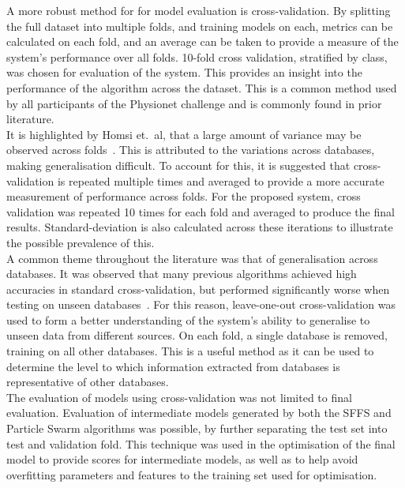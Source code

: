 \documentclass[titlepage, 12pt]{scrartcl} \usepackage{enumitem}
\begin{document}
A more robust method for for model evaluation is cross-validation. By splitting
the full dataset into multiple folds, and training models on each, metrics can
be calculated on each fold, and an average can be taken to provide a measure of
the system's performance over all folds. 10-fold cross validation, stratified
by class, was chosen for evaluation of the system. This provides an insight
into the performance of the algorithm across the dataset. This is a common
method used by all participants of the Physionet challenge and is commonly found
in prior literature.\\
It is highlighted by Homsi et.\ al, that a large amount of variance may be
observed across folds~\parencite[p.1637]{Homsi2017}. This is attributed to the
variations across databases, making generalisation difficult. To account for
this, it is suggested that cross-validation is repeated multiple times and
averaged to provide a more accurate measurement of performance across folds.
For the proposed system, cross validation was repeated 10 times for each fold
and averaged to produce the final results. Standard-deviation is also
calculated across these iterations to illustrate the possible prevalence of
this.\\

A common theme throughout the literature was that of generalisation across
databases. It was observed that many previous algorithms achieved high
accuracies in standard cross-validation, but performed significantly worse when
testing on unseen databases~\parencite{Homsi2017, Bobillo2016}. For this
reason, leave-one-out cross-validation was used to form a better understanding
of the system's ability to generalise to unseen data from different sources. On
each fold, a single database is removed, training on all other databases. This
is a useful method as it can be used to determine the level to which
information extracted from databases is representative of other databases.\\

The evaluation of models using cross-validation was not limited to final
evaluation. Evaluation of intermediate models generated by both the SFFS and Particle Swarm
algorithms was possible, by further separating the test set into test and
validation fold. This technique was used in the optimisation of the
final model to provide scores for intermediate models, as well as to help avoid
overfitting parameters and features to the training set used for
optimisation.\\
\end{document}
